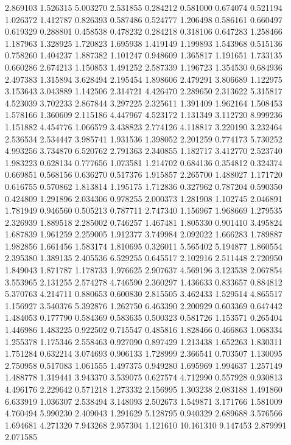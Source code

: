 2.869103
1.526315
5.003270
2.531855
0.284212
0.581000
0.674074
0.521194
1.026372
1.412787
0.826393
0.587486
0.524777
1.206498
0.586161
0.660497
0.619329
0.288801
0.458538
0.478232
0.284218
0.318106
0.647283
1.258466
1.187963
1.328925
1.720823
1.695938
1.419149
1.199893
1.543968
0.515136
0.758260
1.404237
1.887382
1.101247
0.948609
1.365817
1.191651
1.733135
0.660286
2.674213
1.150853
1.491252
2.587339
1.196723
1.354530
0.684936
2.497383
1.315894
3.628494
2.195454
1.898606
2.479291
3.806689
1.122975
3.153643
3.043889
1.142506
2.314721
4.426470
2.289650
2.313622
5.315817
4.523039
3.702233
2.867844
3.297225
2.325611
1.391409
1.962164
1.508453
1.578166
1.360609
2.115186
4.447967
4.523172
1.131349
3.112720
8.999236
1.151882
4.454776
1.066579
3.438823
2.774126
4.118817
3.220190
3.232464
2.536534
2.534447
3.985741
1.931536
1.398052
2.201259
0.774173
5.730252
4.993256
3.734870
6.520762
2.791363
2.340855
1.182717
3.412770
2.523740
1.983223
0.628134
0.777656
1.073581
1.214702
0.684136
0.354812
0.324374
0.669851
0.568156
0.636270
0.517376
1.915857
2.265700
1.488027
1.171720
0.616755
0.570862
1.813814
1.195175
1.712836
0.327962
0.787204
0.590350
0.424809
1.291896
2.034306
0.978255
2.000373
1.281908
1.102745
2.046891
1.781949
0.946560
0.505213
0.787711
2.747340
1.156967
1.968669
1.279535
2.326939
1.889518
2.285002
0.746257
1.467481
1.805330
0.901410
3.495824
1.687839
1.961259
2.259005
1.912377
3.749984
2.092022
1.666283
1.789887
1.982856
1.661456
1.583174
1.810695
0.326011
5.565402
5.194877
1.860554
2.395380
1.389135
2.405536
6.529255
0.645517
2.102916
2.511448
2.720950
1.849043
1.871787
1.178733
1.976625
2.907637
4.569196
3.123538
2.067854
3.553965
2.131255
2.574278
4.746590
2.360297
1.436633
0.833657
0.884812
5.370763
4.214711
0.880653
0.600830
2.815505
3.462433
1.529514
4.865517
1.156927
3.540376
5.392876
1.262750
6.463390
2.200929
0.603369
0.647442
1.484053
0.177790
0.584369
0.583635
0.500323
0.581726
1.153571
0.265404
1.446986
1.483225
0.922502
0.715547
0.485816
1.828466
0.466863
1.068334
1.255378
1.175346
2.558463
0.927090
0.897429
1.213438
1.652263
1.830311
1.751284
0.632214
3.074693
0.906133
1.728999
2.366541
0.703507
1.130095
2.750958
0.517083
1.061555
1.497375
0.949280
1.695969
1.994637
1.257149
1.488778
1.319441
3.943370
3.539075
0.627574
4.712990
0.557928
0.930813
4.496176
2.229642
0.571218
1.273332
2.156995
1.303238
2.083188
1.491860
6.633919
1.036307
2.538494
3.148093
2.502673
1.549871
3.171766
1.581009
4.760494
5.990230
2.409043
1.291629
5.128795
0.940329
2.689688
3.576566
1.694681
4.271320
7.943268
2.957304
1.121610
10.161310
9.147453
2.879991
2.071585
